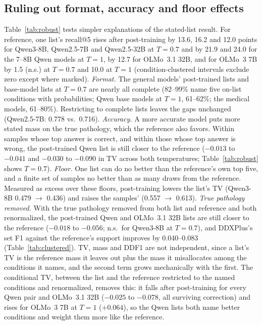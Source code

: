 \documentclass[11pt]{article}
\begin{document}
\subsection{Ruling out format, accuracy and floor effects}\label{sec:statedchecks}
Table~\ref{tab:robust} tests simpler explanations of the stated-list result. For reference, one list's recall@5 rises after post-training by 13.6, 16.2 and 12.0 points for Qwen3-8B, Qwen2.5-7B and Qwen2.5-32B at $T{=}0.7$ and by 21.9 and 24.0 for the 7--8B Qwen models at $T{=}1$, by 12.7 for OLMo~3.1 32B, and for OLMo~3 7B by 1.5 (n.s.) at $T{=}0.7$ and 10.0 at $T{=}1$ (condition-clustered intervals exclude zero except where marked).
\emph{Format.} The general models' post-trained lists and base-model lists at $T{=}0.7$ are nearly all complete (82--99\% name five on-list conditions with probabilities; Qwen base models at $T{=}1$, 61--62\%; the medical models, 61--80\%). Restricting to complete lists leaves the gaps unchanged (Qwen2.5-7B: 0.778 vs.\ 0.716).
\emph{Accuracy.} A more accurate model puts more stated mass on the true pathology, which the reference also favors. Within samples whose top answer is correct, and within those whose top answer is wrong, the post-trained Qwen list is still closer to the reference ($-0.013$ to $-0.041$ and $-0.030$ to $-0.090$ in TV across both temperatures; Table~\ref{tab:robust} shows $T{=}0.7$).
\emph{Floor.} One list can do no better than the reference's own top five, and a finite set of samples no better than as many draws from the reference. Measured as excess over these floors, post-training lowers the list's TV (Qwen3-8B 0.479 $\rightarrow$ 0.436) and raises the samples' (0.557 $\rightarrow$ 0.613).
\emph{True pathology removed.} With the true pathology removed from both list and reference and both renormalized, the post-trained Qwen and OLMo~3.1 32B lists are still closer to the reference ($-0.018$ to $-0.056$; n.s.\ for Qwen3-8B at $T{=}0.7$), and DDXPlus's set F1 against the reference's support improves by 0.040--0.083 (Table~\ref{tab:clustered}). TV, mass and DDF1 are not independent, since a list's TV is the reference mass it leaves out plus the mass it misallocates among the conditions it names, and the second term grows mechanically with the first. The conditional TV, between the list and the reference restricted to the named conditions and renormalized, removes this: it falls after post-training for every Qwen pair and OLMo~3.1 32B ($-0.025$ to $-0.078$, all surviving correction) and rises for OLMo~3 7B at $T{=}1$ ($+0.064$), so the Qwen lists both name better conditions and weight them more like the reference.
\end{document}
